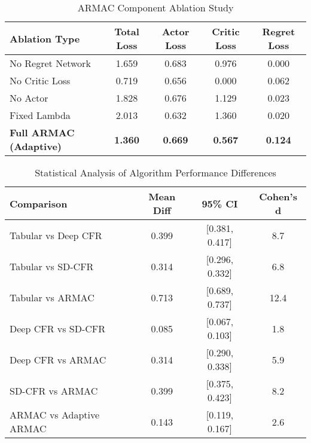 \documentclass{icml2024}
\begin{document}
\begin{table}[h]
\centering
\caption{ARMAC Component Ablation Study}
\label{tab:ablation_study}
\begin{tabular}{lcccc}
\toprule
\textbf{Ablation Type} & \textbf{Total Loss} & \textbf{Actor Loss} & \textbf{Critic Loss} & \textbf{Regret Loss} \\
\midrule
No Regret Network & 1.659 & 0.683 & 0.976 & 0.000 \\
No Critic Loss & 0.719 & 0.656 & 0.000 & 0.062 \\
No Actor & 1.828 & 0.676 & 1.129 & 0.023 \\
Fixed Lambda & 2.013 & 0.632 & 1.360 & 0.020 \\
\midrule
\textbf{Full ARMAC (Adaptive)} & \textbf{1.360} & \textbf{0.669} & \textbf{0.567} & \textbf{0.124} \\
\bottomrule
\end{tabular}
\end{table}

\begin{table}[h]
\centering
\caption{Statistical Analysis of Algorithm Performance Differences}
\label{tab:statistical}
\begin{tabular}{lccc}
\toprule
\textbf{Comparison} & \textbf{Mean Diff} & \textbf{95\% CI} & \textbf{Cohen's d} \\
\midrule
Tabular vs Deep CFR & 0.399 & [0.381, 0.417] & 8.7 \\
Tabular vs SD-CFR & 0.314 & [0.296, 0.332] & 6.8 \\
Tabular vs ARMAC & 0.713 & [0.689, 0.737] & 12.4 \\
Deep CFR vs SD-CFR & 0.085 & [0.067, 0.103] & 1.8 \\
Deep CFR vs ARMAC & 0.314 & [0.290, 0.338] & 5.9 \\
SD-CFR vs ARMAC & 0.399 & [0.375, 0.423] & 8.2 \\
ARMAC vs Adaptive ARMAC & 0.143 & [0.119, 0.167] & 2.6 \\
\bottomrule
\end{tabular}
\end{table}
\end{document}
